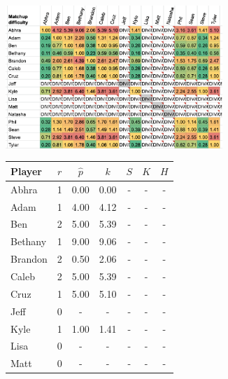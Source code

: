 \documentclass[letterpaper, 10 pt, conference]{ieeeconf}  %
\begin{document}
\begin{figure}[h!b]
\begin{subfigure}[ht]{0.4\textwidth}
        \end{subfigure}
        \begin{subfigure}[hb]{0.5\textwidth}
                \centering
                \includegraphics[width=0.9\textwidth]{fig/difficulty_3.png}
        \end{subfigure}
        \begin{subfigure}[hb]{0.4\textwidth}
                \footnotesize
                \centering
                \begin{tabular}{lccc|ccc}
                        \toprule
                        Player  & $r$   & $\hat{p}$ & $k$ & $S$ & $K$ & $H$ \\
                        \midrule
                        Abhra	& 1	& 0.00	& 0.00 & - & - & - \\
                        Adam	& 1	& 4.00	& 4.12 & - & - & - \\
                        Ben	& 2	& 5.00	& 5.39 & - & - & - \\
                        Bethany	& 1	& 9.00	& 9.06 & - & - & - \\
                        Brandon	& 2	& 0.50	& 2.06 & - & - & - \\
                        Caleb	& 2	& 5.00	& 5.39 & - & - & - \\
                        Cruz	& 1	& 5.00	& 5.10 & - & - & - \\
                        Jeff	& 0	& -  	& -    & - & - & - \\
                        Kyle	& 1	& 1.00	& 1.41 & - & - & - \\
                        Lisa	& 0	& -  	& -    & - & - & - \\
                        Matt	& 0	& -  	& -    & - & - & - \\

\end{tabular}
\end{subfigure}
\end{figure}
\end{document}
